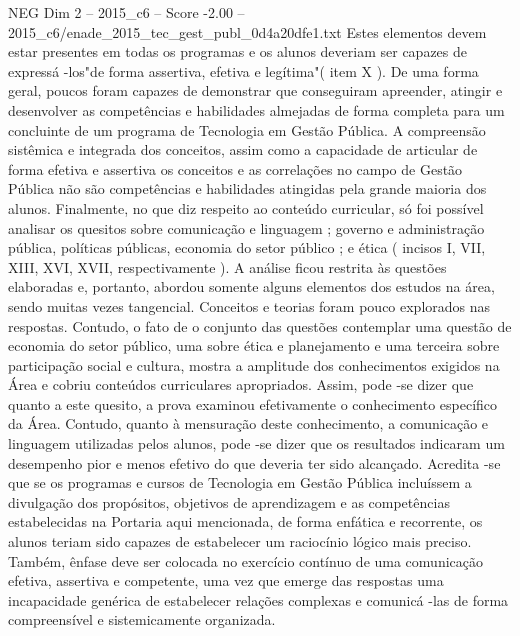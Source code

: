 \begin{textsample}{NEG Dim 2 – 2015\_c6 – Score -2.00 – 2015\_c6/enade\_2015\_tec\_gest\_publ\_0d4a20dfe1.txt}
Estes elementos devem estar presentes em todas os programas e os alunos deveriam ser capazes de expressá -los"de forma assertiva, efetiva e legítima"( item X ).
De uma forma geral, poucos foram capazes de demonstrar que conseguiram apreender, atingir e desenvolver as competências e habilidades almejadas de forma completa para um concluinte de um programa de Tecnologia em Gestão Pública.
A compreensão sistêmica e integrada dos conceitos, assim como a capacidade de articular de forma efetiva e assertiva os conceitos e as correlações no campo de Gestão Pública não são competências e habilidades atingidas pela grande maioria dos alunos.
Finalmente, no que diz respeito ao conteúdo curricular, só foi possível analisar os quesitos sobre comunicação e linguagem ; governo e administração pública, políticas públicas, economia do setor público ; e ética ( incisos I, VII, XIII, XVI, XVII, respectivamente ).
A análise ficou restrita às questões elaboradas e, portanto, abordou somente alguns elementos dos estudos na área, sendo muitas vezes tangencial.
Conceitos e teorias foram pouco explorados nas respostas.
Contudo, o fato de o conjunto das questões contemplar uma questão de economia do setor público, uma sobre ética e planejamento e uma terceira sobre participação social e cultura, mostra a amplitude dos conhecimentos exigidos na Área e cobriu conteúdos curriculares apropriados.
Assim, pode -se dizer que quanto a este quesito, a prova examinou efetivamente o conhecimento específico da Área.
Contudo, quanto à mensuração deste conhecimento, a comunicação e linguagem utilizadas pelos alunos, pode -se dizer que os resultados indicaram um desempenho pior e menos efetivo do que deveria ter sido alcançado.
Acredita -se que se os programas e cursos de Tecnologia em Gestão Pública incluíssem a divulgação dos propósitos, objetivos de aprendizagem e as competências estabelecidas na Portaria aqui mencionada, de forma enfática e recorrente, os alunos teriam sido capazes de estabelecer um raciocínio lógico mais preciso.
Também, ênfase deve ser colocada no exercício contínuo de uma comunicação efetiva, assertiva e competente, uma vez que emerge das respostas uma incapacidade genérica de estabelecer relações complexas e comunicá -las de forma compreensível e sistemicamente organizada.

\end{textsample}
